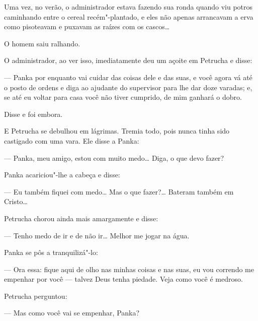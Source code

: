 Uma vez, no verão, o administrador estava fazendo sua ronda quando viu
potros caminhando entre o cereal recém"-plantado, e eles não apenas
arrancavam a erva como pisoteavam e puxavam as raízes com os cascos\ldots{}

O homem saiu ralhando.


O administrador, ao ver isso, imediatamente deu um açoite em Petrucha e
disse:

--- Panka por enquanto vai cuidar das coisas dele e das suas, e você
agora vá até o posto de ordens e diga ao ajudante do supervisor para lhe
dar doze varadas; e, se até eu voltar para casa você não tiver cumprido,
de mim ganhará o dobro.

Disse e foi embora.

E Petrucha se debulhou em lágrimas. Tremia todo, pois nunca tinha sido
castigado com uma vara. Ele disse a Panka:

--- Panka, meu amigo, estou com muito medo\ldots{} Diga, o que devo fazer?

Panka acariciou"-lhe a cabeça e disse:

--- Eu também fiquei com medo\ldots{} Mas o que fazer?\ldots{} Bateram também em
Cristo\ldots{}

Petrucha chorou ainda mais amargamente e disse:

--- Tenho medo de ir e de não ir\ldots{} Melhor me jogar na água.

Panka se pôs a tranquilizá"-lo:

--- Ora essa: fique aqui de olho nas minhas coisas e nas suas, eu vou
correndo me empenhar por você --- talvez Deus tenha piedade. Veja como
você é medroso.

Petrucha perguntou:

--- Mas como você vai se empenhar, Panka?

